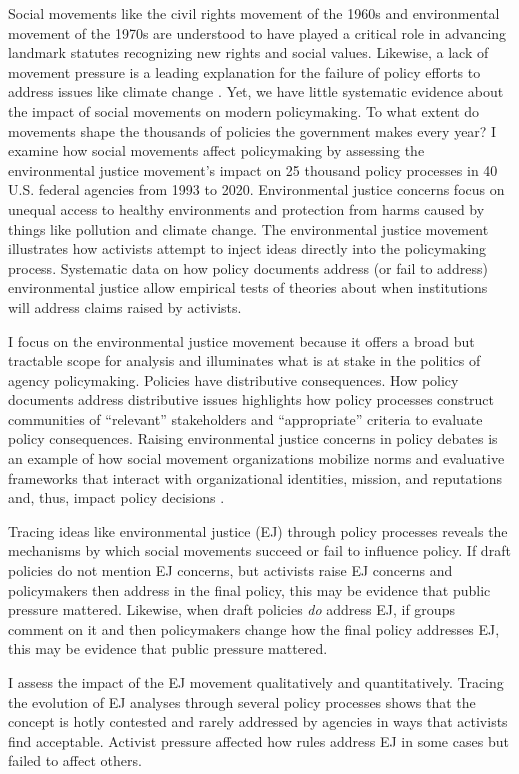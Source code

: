\documentclass[
      12pt,
        ]{article}
\begin{document}
Social movements like the civil rights movement of the 1960s and environmental movement of the 1970s are understood to have played a critical role in advancing landmark statutes recognizing new rights and social values. Likewise, a lack of movement pressure is a leading explanation for the failure of policy efforts to address issues like climate change \citep{Skocpol2013}. Yet, we have little systematic evidence about the impact of social movements on modern policymaking. To what extent do movements shape the thousands of policies the government makes every year? I examine how social movements affect policymaking by assessing the environmental justice movement's impact on 25 thousand policy processes in 40 U.S. federal agencies from 1993 to 2020. Environmental justice concerns focus on unequal access to healthy environments and protection from harms caused by things like pollution and climate change. The environmental justice movement illustrates how activists attempt to inject ideas directly into the policymaking process. Systematic data on how policy documents address (or fail to address) environmental justice allow empirical tests of theories about when institutions will address claims raised by activists.

I focus on the environmental justice movement because it offers a broad but tractable
scope for analysis and illuminates what is at stake in the politics of
agency policymaking. Policies have distributive consequences. How policy documents address distributive issues highlights how policy processes construct communities of ``relevant'' stakeholders and ``appropriate'' criteria to evaluate policy consequences.
Raising environmental justice concerns in policy debates is an example of how social movement organizations mobilize norms and evaluative frameworks that interact with organizational identities, mission, and reputations and, thus, impact policy decisions \citep{Carpenter2001}.

Tracing ideas like environmental justice (EJ) through policy processes reveals the mechanisms by which social movements succeed or fail to influence policy. If draft policies do not mention EJ concerns, but activists raise EJ concerns and policymakers then address in the final policy, this may be evidence that public pressure mattered. Likewise, when draft policies \emph{do} address EJ, if groups comment on it and then policymakers change how the final policy addresses EJ, this may be evidence that public pressure mattered.

I assess the impact of the EJ movement qualitatively and quantitatively. Tracing the evolution of EJ analyses through several policy processes shows that the concept is hotly contested and rarely addressed by agencies in ways that activists find acceptable. Activist pressure affected how rules address EJ in some cases but failed to affect others.
\end{document}
